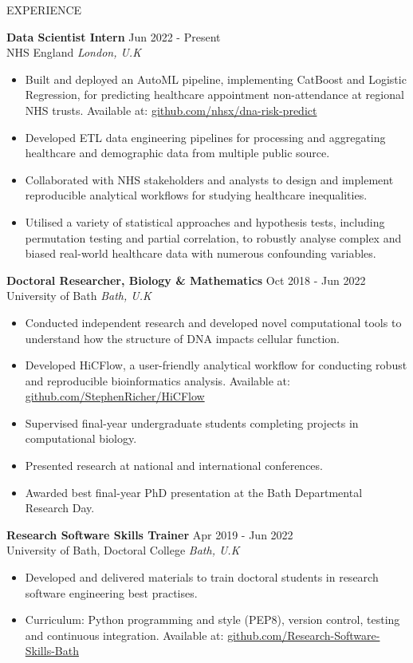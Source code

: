 \documentclass{cv} %
\begin{document}
\begin{rSection}{EXPERIENCE}

\textbf{Data Scientist Intern} \hfill Jun 2022 - Present \\
NHS England \hfill \textit{London, U.K}
 \begin{itemize}
    \itemsep -3pt {} 
    \item Built and deployed an AutoML pipeline, implementing CatBoost and Logistic Regression, for predicting healthcare appointment non-attendance at regional NHS trusts. Available at: \href{https://github.com/nhsx/dna-risk-predict}{github.com/nhsx/dna-risk-predict}
    \item Developed ETL data engineering pipelines for processing and aggregating healthcare and demographic data from multiple public source.
    \item Collaborated with NHS stakeholders and analysts to design and implement reproducible analytical workflows for studying healthcare inequalities.
    \item Utilised a variety of statistical approaches and hypothesis tests, including permutation testing and partial correlation, to robustly analyse complex and biased real-world healthcare data with numerous confounding variables.
 \end{itemize}

\textbf{Doctoral Researcher, Biology \& Mathematics} \hfill Oct 2018 - Jun 2022 \\
University of Bath \hfill \textit{Bath, U.K}
 \begin{itemize}
    \itemsep -3pt {} 
    \item Conducted independent research and developed novel computational tools to understand how the structure of DNA impacts cellular function.
    \item Developed HiCFlow, a user-friendly analytical workflow for conducting robust and reproducible bioinformatics analysis. Available at: \href{https://github.com/StephenRicher/HiCFlow}{github.com/StephenRicher/HiCFlow}
    \item Supervised final-year undergraduate students completing projects in computational biology.
    \item Presented research at national and international conferences.
    \item Awarded best final-year PhD presentation at the Bath Departmental Research Day.
 \end{itemize}

\textbf{Research Software Skills Trainer} \hfill Apr 2019 - Jun 2022 \\
University of Bath, Doctoral College \hfill \textit{Bath, U.K}
 \begin{itemize}
    \itemsep -3pt {} 
    \item Developed and delivered materials to train doctoral students in research software engineering best practises.
    \item Curriculum: Python programming and style (PEP8), version control, testing and continuous integration. Available at: \href{https://github.com/Research-Software-Skills-Bath}{github.com/Research-Software-Skills-Bath}
 \end{itemize}


\end{rSection}
\end{document}
